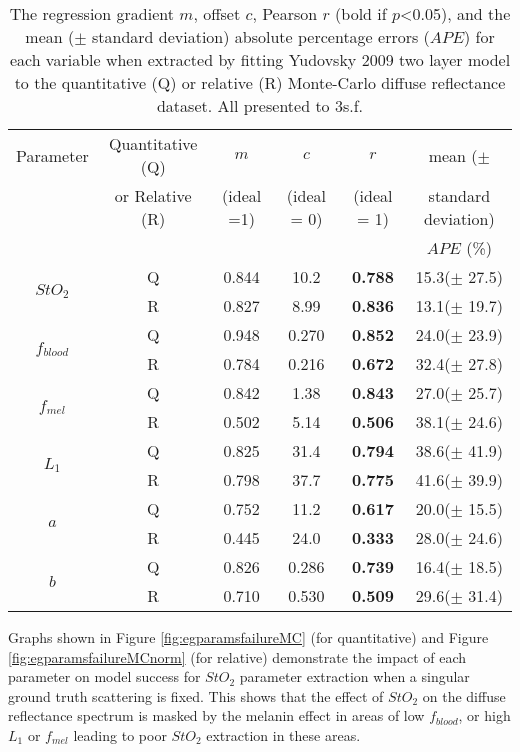 \begin{table}[h]
    \centering
    \caption{The regression gradient $m$, offset $c$, Pearson $r$ (bold if $p$<0.05), and the mean ($\pm$ standard deviation) absolute percentage errors ($APE$) for each variable when extracted by fitting Yudovsky 2009 two layer model to the quantitative (Q) or relative (R) Monte-Carlo diffuse reflectance dataset. All presented to 3s.f.}
    \begin{tabular}{|c|c|cccc|}
        \hline
        Parameter & Quantitative (Q) & $m$ & $c$ & $r$ & mean ($\pm$  \\
        & or Relative (R) & (ideal =1) & (ideal = 0) & (ideal = 1) & standard deviation) \\
        & & & & & $APE$ (\%) \\
        \hline
        \multirow{2}{*}{$StO_2$} & Q & 0.844 & 10.2 & \textbf{0.788} & 15.3($\pm$ 27.5) \\
        & R & 0.827 & 8.99 & \textbf{0.836} & 13.1($\pm$ 19.7) \\
        \hline
        \multirow{2}{*}{$f_{blood}$} & Q & 0.948 & 0.270 & \textbf{0.852} & 24.0($\pm$ 23.9) \\
        & R & 0.784 & 0.216 & \textbf{0.672} & 32.4($\pm$ 27.8) \\
        \hline
        \multirow{2}{*}{$f_{mel}$} & Q & 0.842 & 1.38 & \textbf{0.843} & 27.0($\pm$ 25.7) \\
        & R & 0.502 & 5.14 & \textbf{0.506} & 38.1($\pm$ 24.6) \\
        \hline
        \multirow{2}{*}{$L_1$} & Q & 0.825 & 31.4 & \textbf{0.794} & 38.6($\pm$ 41.9) \\
         & R & 0.798 & 37.7 & \textbf{0.775} & 41.6($\pm$ 39.9) \\
        \hline
        \multirow{2}{*}{$a$} & Q & 0.752 & 11.2 & \textbf{0.617} & 20.0($\pm$ 15.5) \\
        & R & 0.445 & 24.0 & \textbf{0.333} & 28.0($\pm$ 24.6) \\
        \hline
        \multirow{2}{*}{$b$} & Q & 0.826 & 0.286 & \textbf{0.739} & 16.4($\pm$ 18.5) \\
        & R & 0.710 & 0.530 & \textbf{0.509} & 29.6($\pm$ 31.4) \\
        \hline
    \end{tabular}
    \label{tb:doubleparamtrends}
\end{table}
Graphs shown in Figure \ref{fig:egparamsfailureMC} (for quantitative) and Figure \ref{fig:egparamsfailureMCnorm} (for relative) demonstrate the impact of each parameter on model success for $StO_2$ parameter extraction when a singular ground truth scattering is fixed. This shows that the effect of $StO_2$ on the diffuse reflectance spectrum is masked by the melanin effect in areas of low $f_{blood}$, or high $L_1$ or $f_{mel}$ leading to poor $StO_2$ extraction in these areas. 
\FloatBarrier

